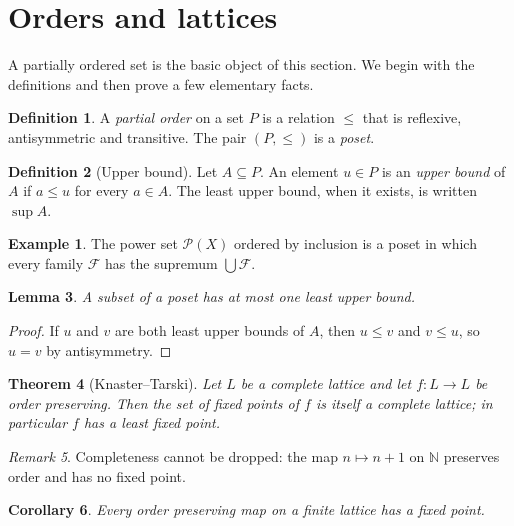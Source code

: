 \documentclass{article}
\theoremstyle{plain}
\newtheorem{theorem}{Theorem}[section]
\newtheorem{lemma}[theorem]{Lemma}
\newtheorem{corollary}[theorem]{Corollary}
\theoremstyle{definition}
\newtheorem{definition}[theorem]{Definition}
\newtheorem{example}{Example}
\theoremstyle{remark}
\newtheorem{remark}[theorem]{Remark}
\begin{document}
\section{Orders and lattices}

A partially ordered set is the basic object of this section. We begin with
the definitions and then prove a few elementary facts.

\begin{definition}
A \emph{partial order} on a set $P$ is a relation $\le$ that is reflexive,
antisymmetric and transitive. The pair $(P,\le)$ is a \emph{poset}.
\end{definition}

\begin{definition}[Upper bound]
Let $A \subseteq P$. An element $u \in P$ is an \emph{upper bound} of $A$ if
$a \le u$ for every $a \in A$. The least upper bound, when it exists, is
written $\sup A$.
\end{definition}

\begin{example}
The power set $\mathcal{P}(X)$ ordered by inclusion is a poset in which every
family $\mathcal{F}$ has the supremum $\bigcup \mathcal{F}$.
\end{example}

\begin{lemma}
A subset of a poset has at most one least upper bound.
\end{lemma}

\begin{proof}
If $u$ and $v$ are both least upper bounds of $A$, then $u \le v$ and
$v \le u$, so $u = v$ by antisymmetry.
\end{proof}

\begin{theorem}[Knaster--Tarski]
Let $L$ be a complete lattice and let $f \colon L \to L$ be order preserving.
Then the set of fixed points of $f$ is itself a complete lattice; in
particular $f$ has a least fixed point.
\end{theorem}

\begin{remark}
Completeness cannot be dropped: the map $n \mapsto n+1$ on $\mathbb{N}$
preserves order and has no fixed point.
\end{remark}

\begin{corollary}
Every order preserving map on a finite lattice has a fixed point.
\end{corollary}
\end{document}
